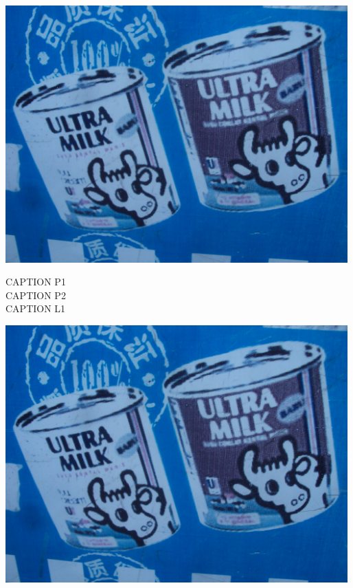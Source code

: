 \documentclass[10pt,letterpaper]{article}
\begin{document}
\vspace{0.25in}
\includegraphics[width=5.19in]{landscape.jpg}

CAPTION P1\\
CAPTION P2\\
CAPTION L1\\
\pagebreak

\includegraphics[width=5.19in]{landscape.jpg}
\end{document}
